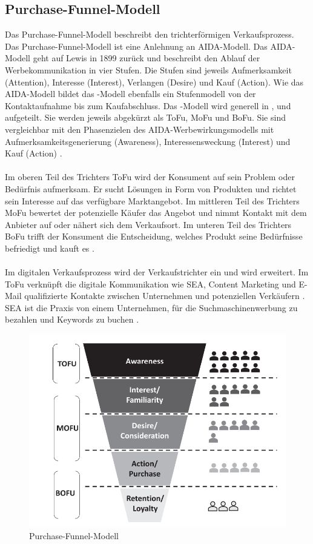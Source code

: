 \subsection{Purchase-Funnel-Modell}
\label{PurchaseFunnelModell}
Das Purchase-Funnel-Modell beschreibt den trichterförmigen Verkaufsprozess. Das Purchase-Funnel-Modell ist eine Anlehnung an AIDA-Modell. Das AIDA-Modell geht auf Lewis in 1899 zurück und beschreibt den Ablauf der Werbekommunikation in vier Stufen. Die Stufen sind jeweils Aufmerksamkeit (Attention), Interesse (Interest), Verlangen (Desire) und Kauf (Action). Wie das AIDA-Modell bildet das -Modell ebenfalls ein Stufenmodell von der Kontaktaufnahme bis zum Kaufabschluss. Das -Modell wird generell in ,  und  aufgeteilt. Sie werden jeweils abgekürzt als \ac{ToFu}, \ac{MoFu} und \ac{BoFu}. Sie sind vergleichbar mit den Phasenzielen des AIDA-Werbewirkungsmodells mit Aufmerksamkeitsgenerierung (Awareness), Interessensweckung (Interest) und Kauf (Action) \cite{Kleinjohann2024}. \\\\
Im oberen Teil des Trichters \ac{ToFu} wird der Konsument auf sein Problem oder Bedürfnis aufmerksam. Er sucht Lösungen in Form von Produkten und richtet sein Interesse auf das verfügbare Marktangebot. Im mittleren Teil des Trichters \ac{MoFu} bewertet der potenzielle Käufer das Angebot und nimmt Kontakt mit dem Anbieter auf oder nähert sich dem Verkaufsort. Im unteren Teil des Trichters \ac{BoFu} trifft der Konsument die Entscheidung, welches Produkt seine Bedürfnisse befriedigt und kauft es \cite{Kleinjohann2024}.\\\\
Im digitalen Verkaufsprozess wird der Verkaufstrichter ein  und wird erweitert. Im \ac{ToFu} verknüpft die digitale Kommunikation wie \ac{SEA}, Content Marketing und E-Mail qualifizierte Kontakte zwischen Unternehmen und potenziellen Verkäufern \cite{Kleinjohann2024}. \ac{SEA} ist die Praxis von einem Unternehmen, für die Suchmaschinenwerbung zu bezahlen und Keywords zu buchen \cite{Bartholomew2005MakingAM}. 
\begin{figure}[H]
    \centering
    \includegraphics[width=0.75\linewidth]{images/Funnel.png}
    \caption{Purchase-Funnel-Modell \cite{Kleinjohann2024}}
    \label{fig:purchase-funnel}
\end{figure}
